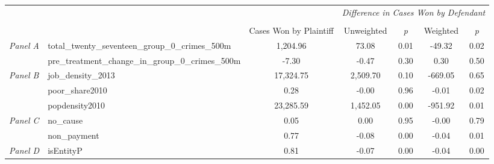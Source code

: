 \begin{tabular}{llccccc}
\toprule
 &  & \textit{} & \multicolumn{4}{c}{\textit{Difference in Cases Won by Defendant}} \\
\cline{4-7}
\\
 &  & Cases Won by Plaintiff & Unweighted & \emph{p} & Weighted & \emph{p} \\
\midrule
\multirow[c]{2}{3cm}{\textit{Panel A}} & total_twenty_seventeen_group_0_crimes_500m & 1,204.96 & 73.08 & 0.01 & -49.32 & 0.02 \\
 & pre_treatment_change_in_group_0_crimes_500m & -7.30 & -0.47 & 0.30 & 0.30 & 0.50 \\
\cline{1-7}
\multirow[c]{3}{3cm}{\textit{Panel B}} & job_density_2013 & 17,324.75 & 2,509.70 & 0.10 & -669.05 & 0.65 \\
 & poor_share2010 & 0.28 & -0.00 & 0.96 & -0.01 & 0.02 \\
 & popdensity2010 & 23,285.59 & 1,452.05 & 0.00 & -951.92 & 0.01 \\
\cline{1-7}
\multirow[c]{2}{3cm}{\textit{Panel C}} & no_cause & 0.05 & 0.00 & 0.95 & -0.00 & 0.79 \\
 & non_payment & 0.77 & -0.08 & 0.00 & -0.04 & 0.01 \\
\cline{1-7}
\textit{Panel D} & isEntityP & 0.81 & -0.07 & 0.00 & -0.04 & 0.00 \\
\cline{1-7}
\bottomrule
\end{tabular}
